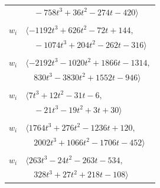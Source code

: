 \documentclass[11pt]{article}
\begin{document}
\begin{longtable}{@{}ll@{}}
 & $\quad -758t^{3}+36t^{2}-274t-420\rangle$\\
\addlinespace[2pt]
\multicolumn{2}{@{}p{0.97\textwidth}@{}}{$i=18$, $D_i=8$, $\rho_{ij}$: $1{:}2, \allowbreak 2{:}2, \allowbreak 5{:}1, \allowbreak 6{:}2, \allowbreak 20{:}2, \allowbreak 26{:}2, \allowbreak 32{:}2, \allowbreak 34{:}2, \allowbreak 50{:}1, \allowbreak 58{:}1$}\\
$w_i$ & $\langle -1192t^{3}+626t^{2}-72t+144,$\\
 & $\quad -1074t^{3}+204t^{2}-262t-316\rangle$\\
\addlinespace[2pt]
\multicolumn{2}{@{}p{0.97\textwidth}@{}}{$i=19$, $D_i=8$, $\rho_{ij}$: $3{:}1, \allowbreak 22{:}1, \allowbreak 26{:}2, \allowbreak 45{:}1, \allowbreak 55{:}2, \allowbreak 56{:}2, \allowbreak 60{:}2$}\\
$w_i$ & $\langle -2192t^{3}-1020t^{2}+1866t-1314,$\\
 & $\quad 830t^{3}-3830t^{2}+1552t-946\rangle$\\
\addlinespace[2pt]
\multicolumn{2}{@{}p{0.97\textwidth}@{}}{$i=20$, $D_i=4$, $\rho_{ij}$: $10{:}1, \allowbreak 11{:}2, \allowbreak 16{:}1, \allowbreak 18{:}1, \allowbreak 33{:}1, \allowbreak 36{:}1, \allowbreak 38{:}1, \allowbreak 41{:}2, \allowbreak 42{:}1, \allowbreak 49{:}1, \allowbreak 50{:}1, \allowbreak 62{:}2$}\\
$w_i$ & $\langle 7t^{3}+12t^{2}-31t-6,$\\
 & $\quad -21t^{3}-19t^{2}+3t+30\rangle$\\
\addlinespace[2pt]
\multicolumn{2}{@{}p{0.97\textwidth}@{}}{$i=21$, $D_i=160$, $\rho_{ij}$: $4{:}1, \allowbreak 12{:}2, \allowbreak 27{:}1, \allowbreak 30{:}1, \allowbreak 50{:}1, \allowbreak 56{:}1, \allowbreak 57{:}2, \allowbreak 60{:}1, \allowbreak 61{:}2, \allowbreak 66{:}1$}\\
$w_i$ & $\langle 1764t^{3}+276t^{2}-1236t+120,$\\
 & $\quad 2002t^{3}+1066t^{2}-1706t-452\rangle$\\
\addlinespace[2pt]
\multicolumn{2}{@{}p{0.97\textwidth}@{}}{$i=22$, $D_i=8$, $\rho_{ij}$: $1{:}1, \allowbreak 9{:}2, \allowbreak 11{:}2, \allowbreak 15{:}2, \allowbreak 19{:}2, \allowbreak 24{:}1, \allowbreak 25{:}2, \allowbreak 26{:}1, \allowbreak 28{:}1, \allowbreak 43{:}2, \allowbreak 44{:}2, \allowbreak 49{:}2, \allowbreak 52{:}1, \allowbreak 56{:}2$}\\
$w_i$ & $\langle 263t^{3}-24t^{2}-263t-534,$\\
 & $\quad 328t^{3}+27t^{2}+218t-108\rangle$\\

\end{longtable}
\end{document}
